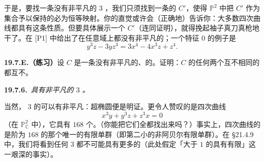 于是，要找一条没有非平凡\trAutomorphism{}的\trGenus{} $3$ \trCurve，我们只须找到一条\trSmooth{}的\trPlaneQuartic{} $C'$，使得 $\mathbb{P}^2$ 中把 $C'$ 作为集合予以保持的\trAutomorphism{}必为恒等映射。你的直觉或许会（正确地）告诉你：大多数四次曲线都具有这条性质。但要具体展示一个 $C'$（连同证明），就得挽起袖子真刀真枪地干了。\trPoonen{}在 [P1] 中给出了在任意域上都没有非平凡\trAutomorphism{}的\trCurve；一个特征 $0$ 的例子是
\[
y^3z-3yz^3=3x^4-4x^3z+z^4.
\]

\textbf{19.7.E.（练习）}\quad 设 $C$ 是一条没有非平凡\trAutomorphism{}的\trSmooth、\trProjective{}的\trCurve。证明：$C$ 的任何两个互不相同的\trOpenSubset{}都互不\trIsomorphic。

\textbf{19.7.6.}\ \emph{具有非平凡\trAutomorphism{}的\trGenus{} $3$ \trCurve。}

当然，\trGenus{} $3$ 的\trCurve{}可以有非平凡\trAutomorphism：超椭圆\trCurve{}便是明证。更令人赞叹的是\trKlein{}四次曲线
\[
x^3y+y^3z+z^3x=0
\]
（在 $\mathbb{P}^2_{\mathbb{C}}$ 中），它具有 $168$ 个\trAutomorphism。（你能把它们全都找出来吗？）事实上，\trKlein{}四次曲线的\trAutomorphismGroup{}是阶为 $168$ 的那个唯一的有限单群（即第二小的非阿贝尔有限单群）。在 \S21.4.9 中，我们将看到任何\trGenus{} $3$ \trCurve{}都不可能具有更多的\trAutomorphism（此处假定「\trGenus{}大于 $1$ 的\trCurve{}具有有限\trAutomorphismGroup」这一艰深的事实）。
